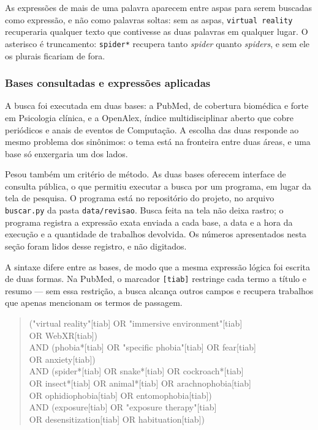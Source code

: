As expressões de mais de uma palavra aparecem entre aspas para serem
buscadas como expressão, e não como palavras soltas: sem as aspas,
\texttt{virtual reality} recuperaria qualquer texto que contivesse as
duas palavras em qualquer lugar. O asterisco é truncamento:
\texttt{spider*} recupera tanto \textit{spider} quanto \textit{spiders},
e sem ele os plurais ficariam de fora.

\subsubsection{Bases consultadas e expressões aplicadas}

A busca foi executada em duas bases: a PubMed, de cobertura biomédica e
forte em Psicologia clínica, e a OpenAlex, índice multidisciplinar aberto
que cobre periódicos e anais de eventos de Computação. A escolha das duas
responde ao mesmo problema dos sinônimos: o tema está na fronteira entre
duas áreas, e uma base só enxergaria um dos lados.

Pesou também um critério de método. As duas bases oferecem interface de
consulta pública, o que permitiu executar a busca por um programa, em
lugar da tela de pesquisa. O programa está no repositório do projeto, no
arquivo \texttt{buscar.py} da pasta \texttt{data/revisao}. Busca feita na tela não deixa rastro; o programa
registra a expressão exata enviada a cada base, a data e a hora da
execução e a quantidade de trabalhos devolvida. Os números apresentados
nesta seção foram lidos desse registro, e não digitados.

A sintaxe difere entre as bases, de modo que a mesma expressão lógica foi
escrita de duas formas. Na PubMed, o marcador \texttt{[tiab]} restringe
cada termo a título e resumo --- sem essa restrição, a busca alcança
outros campos e recupera trabalhos que apenas mencionam os termos de
passagem.

\begin{quote}\footnotesize\singlespacing\ttfamily
("virtual reality"[tiab] OR "immersive environment"[tiab]\\
\phantom{xxxxx}OR WebXR[tiab])\\
AND (phobia*[tiab] OR "specific phobia"[tiab] OR fear[tiab]\\
\phantom{xxxxx}OR anxiety[tiab])\\
AND (spider*[tiab] OR snake*[tiab] OR cockroach*[tiab]\\
\phantom{xxxxx}OR insect*[tiab] OR animal*[tiab] OR arachnophobia[tiab]\\
\phantom{xxxxx}OR ophidiophobia[tiab] OR entomophobia[tiab])\\
AND (exposure[tiab] OR "exposure therapy"[tiab]\\
\phantom{xxxxx}OR desensitization[tiab] OR habituation[tiab])
\end{quote}

